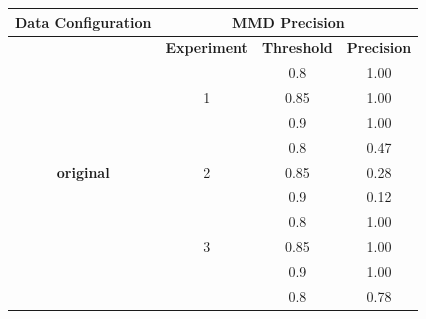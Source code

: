 \documentclass{mpaper}
\begin{document}
\begin{table}[]
\centering
\begin{tabular}{|c|ccc|}
\hline
\multicolumn{1}{|l|}{\textbf{Data Configuration}} & \multicolumn{3}{c|}{\textbf{MMD Precision}}                                                                   \\ \hline
\multirow{13}{*}{\textbf{original}}               & \multicolumn{1}{c|}{\textbf{Experiment}}       & \multicolumn{1}{c|}{\textbf{Threshold}} & \textbf{Precision} \\ \cline{2-4} 
                                                  & \multicolumn{1}{c|}{}                          & \multicolumn{1}{c|}{0.8}                & 1.00               \\
                                                  & \multicolumn{1}{c|}{1}                         & \multicolumn{1}{c|}{0.85}               & 1.00               \\
                                                  & \multicolumn{1}{c|}{}                          & \multicolumn{1}{c|}{0.9}                & 1.00               \\ \cline{2-4} 
                                                  & \multicolumn{1}{c|}{}                          & \multicolumn{1}{c|}{0.8}                & 0.47               \\
                                                  & \multicolumn{1}{c|}{2}                         & \multicolumn{1}{c|}{0.85}               & 0.28               \\
                                                  & \multicolumn{1}{c|}{}                          & \multicolumn{1}{c|}{0.9}                & 0.12               \\ \cline{2-4} 
                                                  & \multicolumn{1}{c|}{}                          & \multicolumn{1}{c|}{0.8}                & 1.00               \\
                                                  & \multicolumn{1}{c|}{3}                         & \multicolumn{1}{c|}{0.85}               & 1.00               \\
                                                  & \multicolumn{1}{c|}{}                          & \multicolumn{1}{c|}{0.9}                & 1.00               \\ \cline{2-4} 
                                                  & \multicolumn{1}{c|}{}                          & \multicolumn{1}{c|}{0.8}                & 0.78               \\

\end{tabular}
\end{table}
\end{document}
